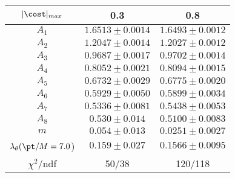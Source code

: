 \begin{tabular}{c|c|c}
$|\cost|_{max}$ & 0.3 & 0.8\\
\hline
$A_1$ & $1.6513\pm0.0014$ & $1.6493\pm0.0012$ \\
$A_2$ & $1.2047\pm0.0014$ & $1.2027\pm0.0012$ \\
$A_3$ & $0.9687\pm0.0017$ & $0.9702\pm0.0014$ \\
$A_4$ & $0.8052\pm0.0021$ & $0.8094\pm0.0015$ \\
$A_5$ & $0.6732\pm0.0029$ & $0.6775\pm0.0020$ \\
$A_6$ & $0.5929\pm0.0050$ & $0.5899\pm0.0034$ \\
$A_7$ & $0.5336\pm0.0081$ & $0.5438\pm0.0053$ \\
$A_8$ & $0.530\pm0.014$ & $0.5100\pm0.0083$ \\
$m$ & $0.054\pm0.013$ & $0.0251\pm0.0027$ \\
$\lambda_\theta(\pt/M = 7.0$) & $0.159\pm0.027$ & $0.1566\pm0.0095$ \\
\hline
$\chi^2$/ndf & 50/38 & 120/118
\end{tabular}
